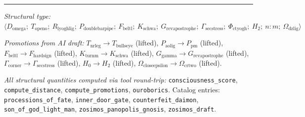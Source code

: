 \documentclass[12pt,a4paper]{article}
\begin{document}
\begin{center}
\rule{0.5\textwidth}{0.4pt}
\end{center}

\emph{Structural type:} $\langle D_{\text{omega}};\ T_{\text{openo}};\ R_{\text{lyoghlig}};\ P_{\text{doublebarpipe}};\ F_{\text{beltl}};\ K_{\text{schwa}};\ G_{\text{revapostrophe}};\ \Gamma_{\text{secstress}};\ \Phi_{\text{ctyogh}};\ H_2;\ n:m;\ \Omega_{\text{dzlig}} \rangle$

\emph{Promotions from AI draft:} $T_{\text{nrleg}} \to T_{\text{bullseye}}$ (lifted), $P_{\text{aolig}} \to P_\text{pm}$ (lifted), $F_{\text{beltl}} \to F_{\text{hardsign}}$ (lifted), $K_{\text{turnm}} \to K_{\text{schwa}}$ (lifted), $G_{\text{gamma}} \to G_{\text{revapostrophe}}$ (lifted), $\Gamma_{\text{corner}} \to \Gamma_{\text{secstress}}$ (lifted), $H_0 \to H_2$ (lifted), $\Omega_{\text{closeepsilon}} \to \Omega_{\text{crtwo}}$ (lifted).

\emph{All structural quantities computed via tool round-trip:} \texttt{consciousness\_score}, \texttt{compute\_distance}, \texttt{compute\_promotions}, \texttt{ouroborics}. Catalog entries: \texttt{processions\_of\_fate}, \texttt{inner\_door\_gate}, \texttt{counterfeit\_daimon}, \texttt{son\_of\_god\_light\_man}, \texttt{zosimos\_panopolis\_gnosis}, \texttt{zosimos\_draft}.
\end{document}
